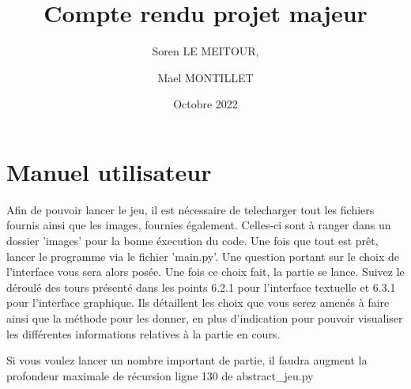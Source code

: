 \documentclass{article}
\title{Compte rendu projet majeur}
\author{Soren LE MEITOUR, \and Mael MONTILLET}
\date{Octobre 2022}
\begin{document}
    \maketitle
    \tableofcontents
        
        \bigskip
        
        \bigskip
        
        \bigskip
        
        \section{Manuel utilisateur}
            Afin de pouvoir lancer le jeu, il est nécessaire de telecharger tout les fichiers fournis ainsi que les images, fournies également. Celles-ci sont à ranger dans un dossier 'images' pour la bonne éxecution du code. Une fois que tout est prêt, lancer le programme via le fichier 'main.py'. Une question portant sur le choix de l'interface vous sera alors posée. Une fois ce choix fait, la partie se lance. Suivez le déroulé des tours présenté dans les points 6.2.1 pour l'interface textuelle et 6.3.1 pour l'interface graphique. Ils détaillent les choix que vous serez amenés à faire ainsi que la méthode pour les donner, en plus d'indication pour pouvoir visualiser les différentes informations relatives à la partie en cours.
            
            Si vous voulez lancer un nombre important de partie, il faudra augment la profondeur maximale de récursion ligne 130 de abstract\_jeu.py
        
\end{document}
